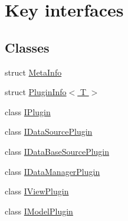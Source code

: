 \hypertarget{group__key__interfaces}{}\section{Key interfaces}
\label{group__key__interfaces}
\subsection*{Classes}
\begin{DoxyCompactItemize}
\item 
struct \hyperlink{struct_meta_info}{Meta\+Info}
\item 
struct \hyperlink{struct_plugin_info}{Plugin\+Info$<$ T $>$}
\item 
class \hyperlink{class_i_plugin}{I\+Plugin}
\item 
class \hyperlink{class_i_data_source_plugin}{I\+Data\+Source\+Plugin}
\item 
class \hyperlink{class_i_data_base_source_plugin}{I\+Data\+Base\+Source\+Plugin}
\item 
class \hyperlink{class_i_data_manager_plugin}{I\+Data\+Manager\+Plugin}
\item 
class \hyperlink{class_i_view_plugin}{I\+View\+Plugin}
\item 
class \hyperlink{class_i_model_plugin}{I\+Model\+Plugin}
\end{DoxyCompactItemize}
